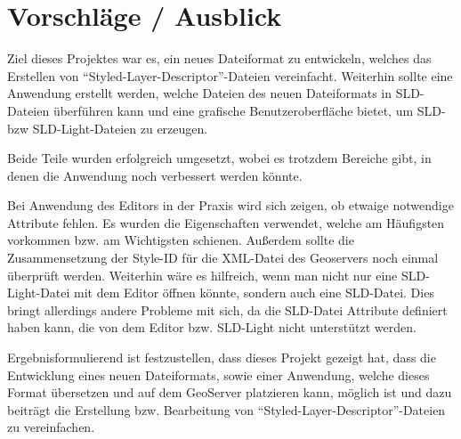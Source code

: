 \section{Vorschläge / Ausblick}
Ziel dieses Projektes war es, ein neues Dateiformat zu entwickeln, welches das Erstellen von \enquote{Styled-Layer-Descriptor}-Dateien vereinfacht. Weiterhin sollte eine Anwendung erstellt werden, welche Dateien des neuen Dateiformats in SLD-Dateien überführen kann und eine grafische Benutzeroberfläche bietet, um SLD- bzw SLD-Light-Dateien zu erzeugen. 

Beide Teile wurden erfolgreich umgesetzt, wobei es trotzdem Bereiche gibt, in denen die Anwendung noch verbessert werden könnte.

Bei Anwendung des Editors in der Praxis wird sich zeigen, ob etwaige notwendige Attribute fehlen. Es wurden die Eigenschaften verwendet, welche am Häufigsten vorkommen bzw. am Wichtigsten schienen. 
Außerdem sollte die Zusammensetzung der Style-ID für die XML-Datei des Geoservers noch einmal überprüft werden. 
Weiterhin wäre es hilfreich, wenn man nicht nur eine SLD-Light-Datei mit dem Editor öffnen könnte, sondern auch eine SLD-Datei. Dies bringt allerdings andere Probleme mit sich, da die SLD-Datei Attribute definiert haben kann, die von dem Editor bzw. SLD-Light nicht unterstützt werden. 

Ergebnisformulierend ist festzustellen, dass dieses Projekt gezeigt hat, dass die Entwicklung eines neuen Dateiformats, sowie einer Anwendung, welche dieses Format übersetzen und auf dem GeoServer platzieren kann, möglich ist und dazu beiträgt die Erstellung bzw. Bearbeitung von \enquote{Styled-Layer-Descriptor}-Dateien zu vereinfachen. 